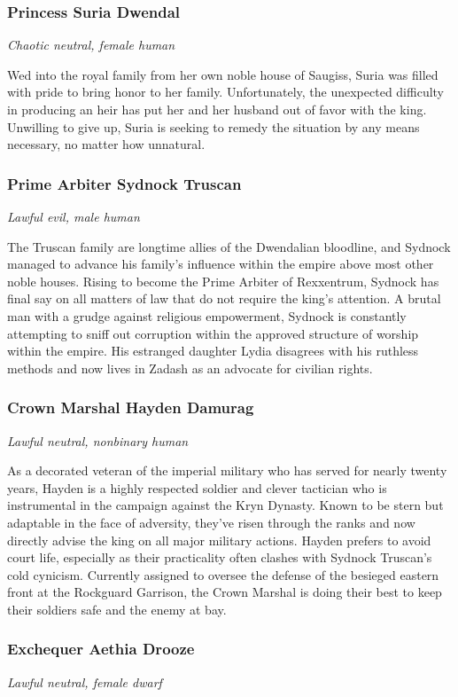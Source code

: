 \documentclass[10pt,a4paper,twoside,bg=print,twocolumn,openany,nodeprecatedcode]{dndbook}
\begin{document}
\subsubsection{Princess Suria Dwendal}
\textit{Chaotic neutral, female human}

Wed into the royal family from her own noble house of Saugiss, Suria was filled with pride to bring honor to her family. Unfortunately, the unexpected difficulty in producing an heir has put her and her husband out of favor with the king. Unwilling to give up, Suria is seeking to remedy the situation by any means necessary, no matter how unnatural.

\subsubsection{Prime Arbiter Sydnock Truscan}
\textit{Lawful evil, male human}

The Truscan family are longtime allies of the Dwendalian bloodline, and Sydnock managed to advance his family's influence within the empire above most other noble houses. Rising to become the Prime Arbiter of Rexxentrum, Sydnock has final say on all matters of law that do not require the king's attention. A brutal man with a grudge against religious empowerment, Sydnock is constantly attempting to sniff out corruption within the approved structure of worship within the empire. His estranged daughter Lydia disagrees with his ruthless methods and now lives in Zadash as an advocate for civilian rights.

\subsubsection{Crown Marshal Hayden Damurag}
\textit{Lawful neutral, nonbinary human}

As a decorated veteran of the imperial military who has served for nearly twenty years, Hayden is a highly respected soldier and clever tactician who is instrumental in the campaign against the Kryn Dynasty. Known to be stern but adaptable in the face of adversity, they've risen through the ranks and now directly advise the king on all major military actions. Hayden prefers to avoid court life, especially as their practicality often clashes with Sydnock Truscan's cold cynicism. Currently assigned to oversee the defense of the besieged eastern front at the Rockguard Garrison, the Crown Marshal is doing their best to keep their soldiers safe and the enemy at bay.

\subsubsection{Exchequer Aethia Drooze}
\textit{Lawful neutral, female dwarf}
\end{document}
